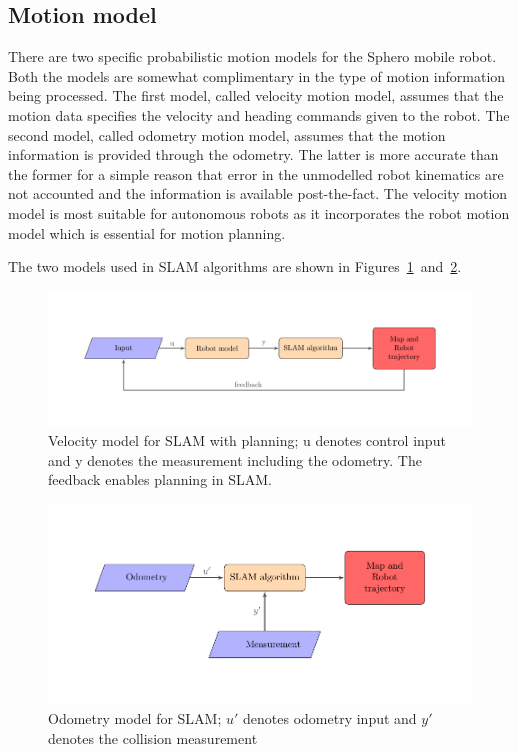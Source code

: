 \subsection{Motion model}
There are two specific probabilistic motion models for the Sphero mobile robot. Both the models are somewhat complimentary in the type of motion information being processed. The first model, called velocity motion model, assumes that the motion data specifies the velocity and heading commands given to the robot. The second model, called odometry motion model, assumes that the motion information is provided through the odometry. The latter is more accurate than the former for a simple reason that error in the unmodelled robot kinematics are not accounted  and the information is available post-the-fact. The velocity motion model is most suitable for autonomous robots as it incorporates the robot motion model which is essential for motion planning. 

The two models used in SLAM algorithms are shown in Figures~\ref{vel_model}~and~\ref{odom_model}. 

\begin{figure}
\centering
\includegraphics[scale=0.75]{./images/vel_model}
\caption[Velocity model]{Velocity model for SLAM with planning; $\text{u}$ denotes control input and y denotes the measurement including the odometry. The feedback enables planning in SLAM.}
\label{vel_model}
\end{figure}

\begin{figure}
\centering
\includegraphics[scale=0.75]{./images/odom_model}
\caption[Odometry model]{Odometry model for SLAM; $u'$ denotes odometry input and $y'$ denotes the collision measurement}
\label{odom_model}
\end{figure}

